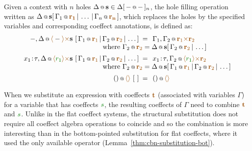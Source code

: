 \begin{definition} Given a context with $n$ holes $\coctx{\Delta}{\textbf{s}} \in 
\Delta[\,\coctx{-}{-}\,]_n$, the hole filling operation written as 
$\coctx{\Delta}{\textbf{s}}[\,\coctx{\Gamma_1}{\aclrd{\mathbf{r_1}}} \,|\, \ldots \,|\, \coctx{\Gamma_n}{\aclrd{\mathbf{r_n}}} \,]$,
which replaces the holes by the specified variables and corresponding coeffect annotations, is defined as:
%
\begin{equation*}
\begin{array}{rcl}
 \coctx{-, \Delta}{\alift{-} \atimes \textbf{s} }
    ~[\,\coctx{\Gamma_1}{\aclrd{\textbf{r}_1}} \,|\, \coctx{\Gamma_2}{\aclrd{\textbf{r}_2}} \,|\, \ldots \,] &\narrow{=}&
      \coctx{\Gamma_1, \Gamma_2}{\aclrd{\textbf{r}_1} \atimes \aclrd{\textbf{r}_2} } \\
 && \qquad \hspace{-9.3em} \textnormal{where}~\coctx{\Gamma_2}{\aclrd{\textbf{r}_2}} =
     \coctx{\Delta}{\textbf{s}}[\, \coctx{\Gamma_2}{\aclrd{\textbf{r}_2}} \,|\, \ldots \,] 
\\[0.5em]
 \coctx{x_1\!:\!\tau, \Delta}{\alift{\cclrd{r_1}} \atimes \textbf{s} }
    ~[\,\coctx{\Gamma_1}{\aclrd{\textbf{r}_1}} \,|\, \coctx{\Gamma_2}{\aclrd{\textbf{r}_2}} \,|\, \ldots \,] &\narrow{=}&
      \coctx{x_1\!:\!\tau, \Gamma_2}{\alift{\cclrd{r_1}} \atimes \aclrd{\textbf{r}_2} } \\
 && \qquad \hspace{-9.3em} \textnormal{where}~\coctx{\Gamma_2}{\aclrd{\textbf{r}_2}} =
     \coctx{\Delta}{\textbf{s}}[\,\coctx{\Gamma_1}{\aclrd{\textbf{r}_1}} \,|\, \coctx{\Gamma_2}{\aclrd{\textbf{r}_2}} \,|\, \ldots \,] 
\\[0.5em]
 \coctx{()}{\alift{}}~[~] &\narrow{=}& \coctx{()}{\alift{}}
\end{array} 
\end{equation*} 
\end{definition}

\noindent
When we substitute an expression with coeffects $\aclrd{\textbf{t}}$ (associated with variables $\Gamma$)
for a variable that has coeffects $\cclrd{s}$, the resulting coeffects of $\Gamma$ need to 
combine $\aclrd{\textbf{t}}$ and $\cclrd{s}$. Unlike in the flat coeffect systems, the structural 
substitution does not require all coeffect algebra operations to coincide and so the combination
is more interesting than in the bottom-pointed substitution for flat coeffects, where it used
the only available operator (Lemma~\ref{thm:cbn-substitution-bot}).

